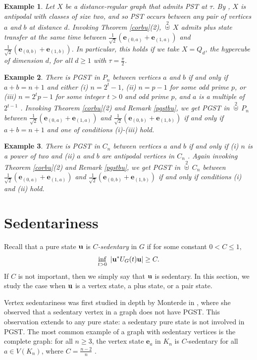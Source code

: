 \documentclass[12pt,a4paper]{article}
\newtheorem{exa}{Example}
\def \e {{\bf e}}
\def \u {{\bf u}}
\def \e {{\mathbf e}}
\newcommand{\mb}[1]{\left|#1\right|}
\begin{document}
\begin{exa}
Let $X$ be a distance-regular graph that admits PST at $\tau$. By \cite[Corollary 4.5]{cou2}, $X$ is antipodal with classes of size two, and so PST occurs between any pair of vertices $a$ and $b$ at distance $d$. Invoking Theorem \ref{corbu}(2), $\overset{2}{\uplus}\ X$ admits plus state transfer at the same time between $\frac{1}{\sqrt2}(\e_{(0,a)}+\e_{(1,a)})$ and $\frac{1}{\sqrt2}(\e_{(0,b)}+\e_{(1,b)})$. In particular, this holds if we take $X=Q_d$, the hypercube of dimension $d$, for all $d\geq 1$ with $\tau=\frac{\pi}{2}$. 
\end{exa}

\begin{exa}
There is PGST in $P_n$ between vertices $a$ and $b$ if and only if $a+b=n+1$ and either (i) $n=2^t-1$, (ii) $n=p-1$ for some odd prime $p$, or (iii) $n=2^tp-1$ for some integer $t>0$ and odd prime $p$, and $a$ is a multiple of $2^{t-1}$ \cite[Theorem 4.3.3]{Bommel2019}. Invoking Theorem \ref{corbu}(2) and Remark \ref{pgstbu}, we get PGST in $\overset{2}{\uplus}\ P_n$ between $\frac{1}{\sqrt2}(\e_{(0,a)}+\e_{(1,a)})$ and $\frac{1}{\sqrt2}(\e_{(0,b)}+\e_{(1,b)})$ if and only if $a+b=n+1$ and one of conditions (i)-(iii) hold.
\end{exa}

\begin{exa}
There is PGST in $C_n$ between vertices $a$ and $b$ if and only if (i) $n$ is a power of two and (ii) $a$ and $b$ are antipodal vertices in $C_n$ \cite[Theorem 13]{pal4}. Again invoking Theorem \ref{corbu}(2) and Remark \ref{pgstbu}, we get PGST in $\overset{2}{\uplus}\ C_n$ between $\frac{1}{\sqrt2}(\e_{(0,a)}+\e_{(1,a)})$ and $\frac{1}{\sqrt2}(\e_{(0,b)}+\e_{(1,b)})$ if and only if conditions (i) and (ii) hold.
\end{exa}

\section{Sedentariness}\label{sec:sed}

Recall that a pure state $\u$ is \textit{$C$-sedentary} in $G$ if for some constant $0 < C \leq 1,$
 \[\inf_{t>0}~\mb{\u^*U_G(t)\u}\geq C.\]
If $C$ is not important, then we simply say that $\u$ is sedentary. In this section, we study the case when $\u$ is a vertex state, a plus state, or a pair state.
 
Vertex sedentariness was first studied in depth by Monterde in \cite{mon}, where she observed that a sedentary vertex in a graph does not have PGST. This observation extends to any pure state: a sedentary pure state is not involved in PGST. The most common example of a graph with sedentary vertices is the complete graph: for all $n\geq 3$, the vertex state $\e_a$ in $K_n$ is $C$-sedentary for all $a\in V(K_n)$, where $C=\frac{n-2}{n}$ \cite[Equation 6]{mon}.
\end{document}
